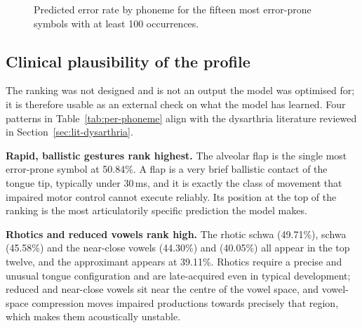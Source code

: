 \begin{figure}[H]
\centering
{}
\caption[Per-phoneme predicted error rates]{Predicted error rate by phoneme for
the fifteen most error-prone symbols with at least 100 occurrences.}
\label{fig:per-phoneme}
\end{figure}

\subsection{Clinical plausibility of the profile}

The ranking was not designed and is not an output the model was optimised for;
it is therefore usable as an external check on what the model has learned. Four
patterns in Table~\ref{tab:per-phoneme} align with the dysarthria literature
reviewed in Section~\ref{sec:lit-dysarthria}.

\textbf{Rapid, ballistic gestures rank highest.} The alveolar flap  is the
single most error-prone symbol at 50.84\%. A flap is a very brief ballistic
contact of the tongue tip, typically under 30\,ms, and it is exactly the class
of movement that impaired motor control cannot execute reliably. Its position at
the top of the ranking is the most articulatorily specific prediction the model
makes.

\textbf{Rhotics and reduced vowels rank high.} The rhotic schwa  (49.71\%),
schwa  (45.58\%) and the near-close vowels  (44.30\%) and 
(40.05\%) all appear in the top twelve, and the approximant  appears at
39.11\%. Rhotics require a precise and unusual tongue configuration and are
late-acquired even in typical development; reduced and near-close vowels sit
near the centre of the vowel space, and vowel-space compression
\cite{kim2011vowel} moves impaired productions towards precisely that region,
which makes them acoustically unstable.

